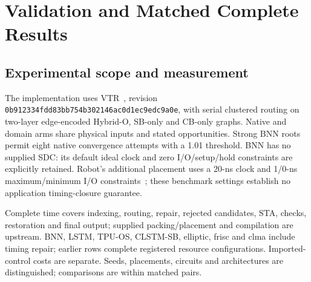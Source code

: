 \documentclass[conference,10pt]{IEEEtran}
\begin{document}
\section{Validation and Matched Complete Results}
\subsection{Experimental scope and measurement}
The implementation uses VTR~\cite{vtr9paper}, revision \texttt{0b912334fdd83bb754b302146ac0d1ec9edc9a0e}, with serial clustered routing on two-layer edge-encoded Hybrid-O, SB-only and CB-only graphs. Native and domain arms share physical inputs and stated opportunities. Strong BNN roots permit eight native convergence attempts with a 1.01 threshold. BNN has no supplied SDC: its default ideal clock and zero I/O/setup/hold constraints are explicitly retained. Robot's additional placement uses a 20-ns clock and 1/0-ns maximum/minimum I/O constraints~\cite{vprsdc}; these benchmark settings establish no application timing-closure guarantee.

Complete time covers indexing, routing, repair, rejected candidates, STA, checks, restoration and final output; supplied packing/placement and compilation are upstream. BNN, LSTM, TPU-OS, CLSTM-SB, elliptic, frisc and clma include timing repair; earlier rows complete registered resource configurations. Imported-control costs are separate. Seeds, placements, circuits and architectures are distinguished; comparisons are within matched pairs.
\end{document}
